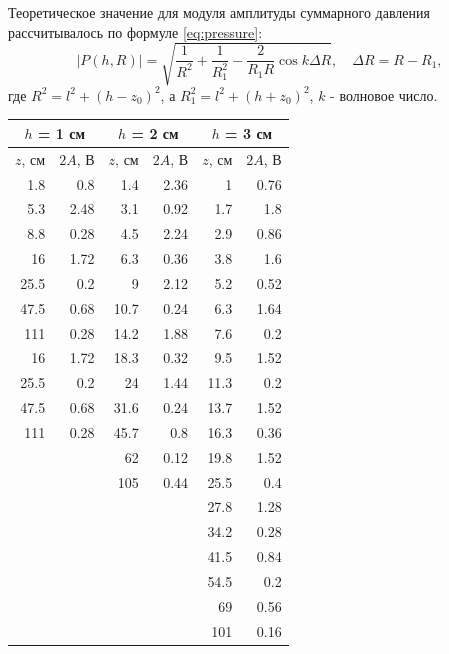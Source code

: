 Теоретическое значение для модуля амплитуды суммарного давления рассчитывалось по формуле \eqref{eq:pressure}:
\begin{equation}
	|P(h,R)| = \sqrt{ \frac{1}{R^2} + \frac{1}{R_1^2} - \frac{2}{R_1 R} \cos k \Delta R },\quad \Delta R = R-R_1,
	\label{eq:pressure}
\end{equation}
где $R^2 = l^2+(h-z_0)^2$, а $R_1^2 = l^2 + (h+z_0)^2$, $k$ - волновое число.

\begin{table}[htbp]
	\centering
	\begin{tabular}{|r|r|r|r|r|r|}
		\toprule
		\multicolumn{2}{|c|}{$h$ = 1 см} & \multicolumn{2}{c|}{$h$ = 2 см} & \multicolumn{2}{c|}{$h$ = 3 см} \\
		\midrule
		\multicolumn{1}{|l|}{$z$, см} & \multicolumn{1}{l|}{$2A$, В} & \multicolumn{1}{l|}{$z$, см} & \multicolumn{1}{l|}{$2A$, В} & \multicolumn{1}{l|}{$z$, см} & \multicolumn{1}{l|}{$2A$, В} \\
		\midrule
		1.8   & 0.8   & 1.4   & 2.36  & 1     & 0.76 \\
		\midrule
		5.3   & 2.48  & 3.1   & 0.92  & 1.7   & 1.8 \\
		\midrule
		8.8   & 0.28  & 4.5   & 2.24  & 2.9   & 0.86 \\
		\midrule
		16    & 1.72  & 6.3   & 0.36  & 3.8   & 1.6 \\
		\midrule
		25.5  & 0.2   & 9     & 2.12  & 5.2   & 0.52 \\
		\midrule
		47.5  & 0.68  & 10.7  & 0.24  & 6.3   & 1.64 \\
		\midrule
		111   & 0.28  & 14.2  & 1.88  & 7.6   & 0.2 \\
		\midrule
		16    & 1.72  & 18.3  & 0.32  & 9.5   & 1.52 \\
		\midrule
		25.5  & 0.2   & 24    & 1.44  & 11.3  & 0.2 \\
		\midrule
		47.5  & 0.68  & 31.6  & 0.24  & 13.7  & 1.52 \\
		\midrule
		111   & 0.28  & 45.7  & 0.8   & 16.3  & 0.36 \\
		\midrule
		&       & 62    & 0.12  & 19.8  & 1.52 \\
		\midrule
		&       & 105   & 0.44  & 25.5  & 0.4 \\
		\midrule
		&       &       &       & 27.8  & 1.28 \\
		\midrule
		&       &       &       & 34.2  & 0.28 \\
		\midrule
		&       &       &       & 41.5  & 0.84 \\
		\midrule
		&       &       &       & 54.5  & 0.2 \\
		\midrule
		&       &       &       & 69    & 0.56 \\
		\midrule
		&       &       &       & 101   & 0.16 \\
		\bottomrule
	\end{tabular}%
\end{table}%

